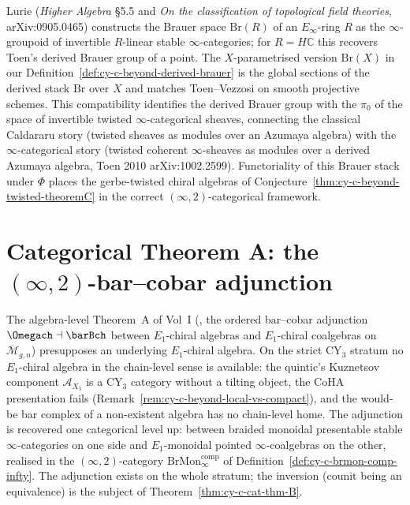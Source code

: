\begin{remark}
\label{rem:cy-c-beyond-lurie-brauer}
Lurie (\emph{Higher Algebra} \S 5.5 and \emph{On the classification of
topological field theories}, arXiv:0905.0465) constructs the Brauer
space $\mathrm{Br}(R)$ of an $E_\infty$-ring $R$ as the $\infty$-groupoid of
invertible $R$-linear stable $\infty$-categories; for $R = H\mathbb{C}$
this recovers Toen's derived Brauer group of a point. The
$X$-parametrised version $\mathrm{Br}(X)$ in our
Definition~\ref{def:cy-c-beyond-derived-brauer} is the global sections
of the derived stack $\mathrm{Br}$ over $X$ and matches Toen--Vezzosi
on smooth projective schemes. This compatibility identifies the
derived Brauer group with the $\pi_0$ of the space of invertible
twisted $\infty$-categorical sheaves, connecting the classical
Caldararu story
(twisted sheaves as modules over an Azumaya algebra) with the
$\infty$-categorical story (twisted coherent $\infty$-sheaves as
modules over a derived Azumaya algebra, Toen 2010 arXiv:1002.2599).
Functoriality of this Brauer stack under $\Phi$ places the
gerbe-twisted chiral algebras of
Conjecture~\ref{thm:cy-c-beyond-twisted-theoremC} in the correct
$(\infty, 2)$-categorical framework.
\end{remark}

\section{Categorical Theorem A: the \texorpdfstring{$(\infty,2)$}{(inf,2)}-bar--cobar adjunction}
\label{sec:cy-c-beyond-cat-thm-A}

The algebra-level Theorem~A of Vol~I
(\cite{VolI}, the ordered bar--cobar
adjunction $\Omegach \dashv \barBch$ between $E_1$-chiral algebras and
$E_1$-chiral coalgebras on $\overline{\mathcal M}_{g,n}$) presupposes an
underlying $E_1$-chiral algebra. On the strict CY$_3$ stratum no
$E_1$-chiral algebra in the chain-level sense is available: the
quintic's Kuznetsov component $\mathcal A_{X_5}$ is a CY$_3$ category
without a tilting object, the CoHA presentation fails
(Remark~\ref{rem:cy-c-beyond-local-vs-compact}), and the would-be
bar complex of a non-existent algebra has no chain-level home. The
adjunction is recovered one categorical level up: between braided
monoidal presentable stable $\infty$-categories on one side and
$E_1$-monoidal pointed $\infty$-coalgebras on the other, realised in
the $(\infty,2)$-category $\mathrm{BrMon}^{\mathrm{comp}}_\infty$ of
Definition~\ref{def:cy-c-brmon-comp-infty}. The adjunction exists on
the whole stratum; the inversion (counit being an equivalence) is the
subject of Theorem~\ref{thm:cy-c-cat-thm-B}.

